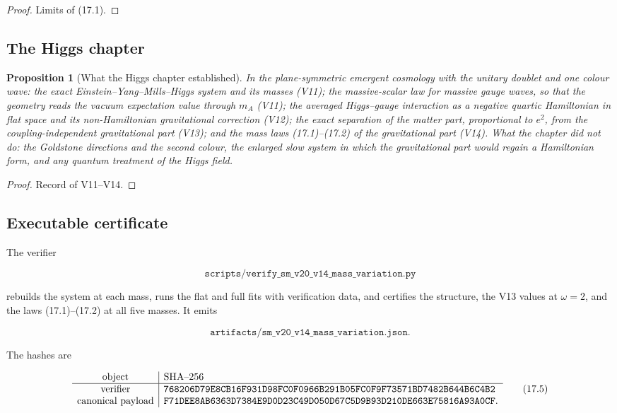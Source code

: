 \documentclass[11pt]{article}
\newtheorem{proposition}[theorem]{Proposition}
\theoremstyle{remark}
\begin{document}
\begin{proof}
Limits of (17.1).
\end{proof}

\subsection{The Higgs chapter}

\begin{proposition}[What the Higgs chapter established]
\label{prop:v20v14-chapter}
In the plane-symmetric emergent cosmology with the unitary doublet
and one colour wave: the exact Einstein--Yang--Mills--Higgs system
and its masses (V11); the massive-scalar law for massive gauge waves,
so that the geometry reads the vacuum expectation value through
\(m_A\) (V11); the averaged Higgs--gauge interaction as a negative
quartic Hamiltonian in flat space and its non-Hamiltonian
gravitational correction (V12); the exact separation of the matter
part, proportional to \(e^2\), from the coupling-independent
gravitational part (V13); and the mass laws (17.1)--(17.2) of the
gravitational part (V14).  What the chapter did not do: the Goldstone
directions and the second colour, the enlarged slow system in which
the gravitational part would regain a Hamiltonian form, and any
quantum treatment of the Higgs field.
\end{proposition}

\begin{proof}
Record of V11--V14.
\end{proof}

\subsection{Executable certificate}

The verifier

\[
 \texttt{scripts/verify\_sm\_v20\_v14\_mass\_variation.py}            \tag{17.3}
\]

rebuilds the system at each mass, runs the flat and full fits with
verification data, and certifies the structure, the V13 values at
\(\omega=2\), and the laws (17.1)--(17.2) at all five masses.  It
emits

\[
 \texttt{artifacts/sm\_v20\_v14\_mass\_variation.json}.               \tag{17.4}
\]

The hashes are

\[
\begin{array}{c|l}
\hbox{object}&\hbox{SHA--256}\\ \hline
\hbox{verifier}&
\texttt{768206D79E8CB16F931D98FC0F0966B291B05FC0F9F73571BD7482B644B6C4B2}\\
\hbox{canonical payload}&
\texttt{F71DEE8AB6363D7384E9D0D23C49D050D67C5D9B93D210DE663E75816A93A0CF}.
\end{array}                                                     \tag{17.5}
\]
\end{document}
